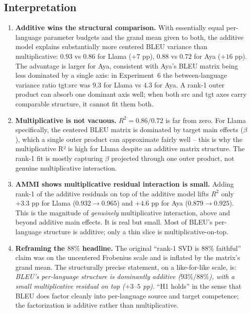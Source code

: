 \documentclass[11pt]{article}
\begin{document}
\subsection{Interpretation}

\begin{enumerate}
  \item \textbf{Additive wins the structural comparison.} With essentially
    equal per-language parameter budgets and the grand mean given to both,
    the additive model explains substantially more centered BLEU variance
    than multiplicative: $0.93$ vs $0.86$ for Llama ($+7$ pp), $0.88$ vs
    $0.72$ for Aya ($+16$ pp). The advantage is larger for Aya, consistent
    with Aya's BLEU matrix being less dominated by a single axis: in
    Experiment~6 the between-language variance ratio tgt:src was $9.3$ for
    Llama vs $4.3$ for Aya. A rank-1 outer product can absorb one dominant
    axis well; when both src and tgt axes carry comparable structure, it
    cannot fit them both.

  \item \textbf{Multiplicative is not vacuous.} $R^2 = 0.86 / 0.72$ is far
    from zero. For Llama specifically, the centered BLEU matrix is
    dominated by target main effects ($\beta$), which a single outer
    product can approximate fairly well -- this is why the multiplicative
    R² is high for Llama despite an additive matrix structure. The rank-1
    fit is mostly capturing $\beta$ projected through one outer product,
    not genuine multiplicative interaction.

  \item \textbf{AMMI shows multiplicative residual interaction is small.}
    Adding rank-1 of the additive residuals on top of the additive model
    lifts $R^2$ only $+3.3$ pp for Llama ($0.932 \to 0.965$) and $+4.6$ pp
    for Aya ($0.879 \to 0.925$). This is the magnitude of \emph{genuinely}
    multiplicative interaction, above and beyond additive main effects.
    It is real but small. Most of BLEU's per-language structure is
    additive; only a thin slice is multiplicative-on-top.

  \item \textbf{Reframing the $88\%$ headline.} The original ``rank-1 SVD
    is $88\%$ faithful'' claim was on the uncentered Frobenius scale and is
    inflated by the matrix's grand mean. The structurally precise statement,
    on a like-for-like scale, is: \emph{BLEU's per-language structure is
    dominantly additive ($93\%/88\%$), with a small multiplicative residual
    on top ($+3$--$5$ pp)}. ``H1 holds'' in the sense that BLEU does factor
    cleanly into per-language source and target competence; the
    factorization is additive rather than multiplicative.
\end{enumerate}
\end{document}
